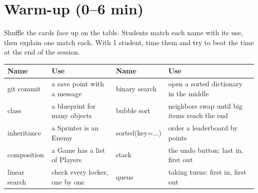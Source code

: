 \section{Warm-up (0--6 min)}
\begin{unplugged}
Shuffle the cards face up on the table. Students match each name with its use, then explain one match each. With 1 student, time them and try to beat the time at the end of the session.
\begin{center}
\small\renewcommand{\arraystretch}{1.2}
\begin{tabular}{|p{2.8cm}|p{3.9cm}|p{2.8cm}|p{3.9cm}|}
\hline
\textbf{Name} & \textbf{Use} & \textbf{Name} & \textbf{Use} \\ \hline
git commit & a save point with a message & binary search & open a sorted dictionary in the middle \\ \hline
class & a blueprint for many objects & bubble sort & neighbors swap until big items reach the end \\ \hline
inheritance & a Sprinter is an Enemy & sorted(key=...) & order a leaderboard by points \\ \hline
composition & a Game has a list of Players & stack & the undo button: last in, first out \\ \hline
linear search & check every locker, one by one & queue & taking turns: first in, first out \\ \hline
\end{tabular}
\end{center}
\end{unplugged}

